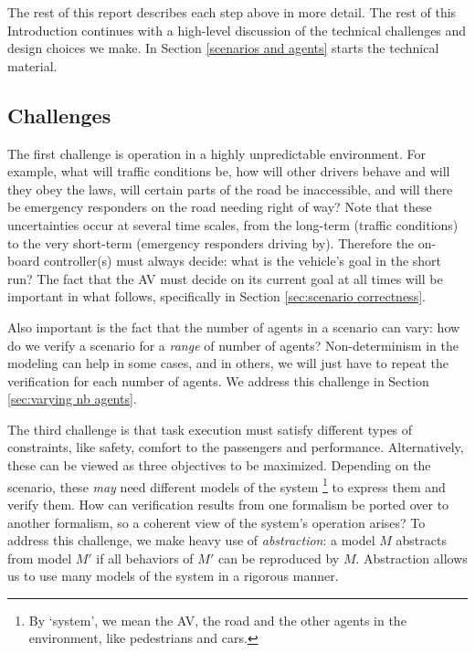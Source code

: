 The rest of this report describes each step above in more detail. 
The rest of this Introduction continues with a high-level discussion of the technical challenges and design choices we make. In Section \ref{scenarios and agents} starts the technical material.

\subsection{Challenges}
\label{sec:challenges}
The first challenge is operation in a highly unpredictable environment.
For example, what will traffic conditions be, how will other drivers behave and will they obey the laws, will certain parts of the road be inaccessible, and will there be emergency responders on the road needing right of way? 
Note that these uncertainties occur at several time scales, from the long-term (traffic conditions) to the very short-term (emergency responders driving by).
Therefore the on-board controller(s) must always decide: what is the vehicle's goal in the short run?
The fact that the AV must decide on its current goal at all times will be important in what follows, specifically in Section \ref{sec:scenario correctness}.

Also important is the fact that the number of agents in a scenario can vary: how do we verify a scenario for a \emph{range} of number of agents?
Non-determinism in the modeling can help in some cases, and in others, we will just have to repeat the verification for each number of agents.
We address this challenge in Section \ref{sec:varying nb agents}.

The third challenge is that task execution must satisfy different types of constraints, like safety, comfort to the passengers and performance.
Alternatively, these can be viewed as three objectives to be maximized.
Depending on the scenario, these \emph{may} need different models of the system \footnote{By `system', we mean the AV, the road and the other agents in the environment, like pedestrians and cars.}
to express them and verify them.
How can verification results from one formalism be ported over to another formalism, so a coherent view of the system's operation arises?
To address this challenge, we make heavy use of \emph{abstraction}: a model $M$ abstracts from model $M'$ if all behaviors of $M'$ can be reproduced by $M$.
Abstraction allows us to use many models of the system in a rigorous manner.

